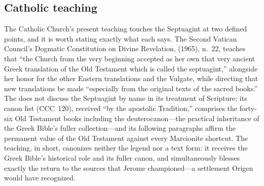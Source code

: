 \subsection{Catholic teaching}

The Catholic Church's present teaching touches the Septuagint at two
defined points, and it is worth stating exactly what each says. The
Second Vatican Council's Dogmatic Constitution on Divine Revelation,
 (1965), n.~22, teaches that ``the Church from the very
beginning accepted as her own that very ancient Greek translation of the
Old Testament which is called the septuagint,'' alongside her honor for
the other Eastern translations and the Vulgate, while directing that new
translations be made ``especially from the original texts of the sacred
books.'' The  does not discuss the Septuagint by name in its treatment of
Scripture; its canon list (CCC~120), received ``by the apostolic
Tradition,'' comprises the forty-six Old Testament books including the
deuterocanon---the practical inheritance of the Greek Bible's fuller
collection---and its following paragraphs affirm the permanent value of
the Old Testament against every Marcionite
shortcut. The teaching, in short, canonizes
neither the legend nor a text form: it receives the Greek Bible's
historical role and its fuller canon, and simultaneously blesses exactly
the return to the sources that Jerome championed---a settlement Origen
would have recognized.
